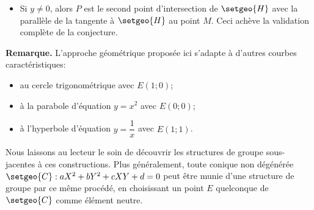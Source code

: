 \begin{enumerate}
\begin{itemize}
	    \item Si $y \neq 0$, alors $P$ est le second point d'intersection de $\setgeo{H}$ avec la parallèle de la tangente à $\setgeo{H}$ au point $M$. Ceci achève la validation complète de la conjecture.
	\end{itemize}
\end{enumerate}


\medskip


\textbf{Remarque.} L'approche géométrique proposée ici s'adapte à d'autres courbes caractéristiques:
\begin{itemize}
    \item au cercle trigonométrique avec $E(1 ; 0)$;
    \item à la parabole d'équation $y = x^2$ avec $E(0 ; 0)$;
    \item à l'hyperbole d'équation $y = \dfrac{1}{x}$ avec $E(1 ; 1)$.
\end{itemize}
Nous laissons au lecteur le soin de découvrir les structures de groupe sous-jacentes à ces constructions.
Plus généralement, toute conique non dégénérée $\setgeo{C} : a X^2 + b Y^2 + c X Y + d = 0$ peut être munie d'une structure de groupe par ce même procédé, en choisissant un point $E$ quelconque de $\setgeo{C}$ comme élément neutre.
